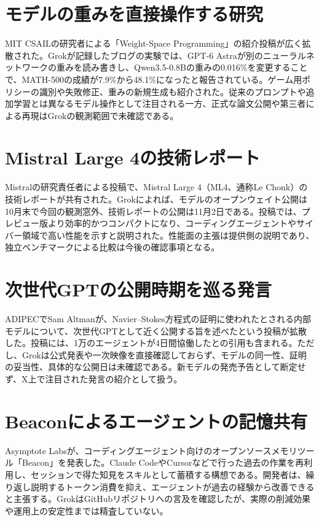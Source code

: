\section{モデルの重みを直接操作する研究}
MIT CSAILの研究者による「Weight-Space Programming」の紹介投稿が広く拡散された。Grokが記録したブログの実験では、GPT-6 Astraが別のニューラルネットワークの重みを読み書きし、Qwen3.5-0.8Bの重みの0.016\%を変更することで、MATH-500の成績が7.9\%から48.1\%になったと報告されている。ゲーム用ポリシーの識別や失敗修正、重みの新規生成も紹介された。従来のプロンプトや追加学習とは異なるモデル操作として注目される一方、正式な論文公開や第三者による再現はGrokの観測範囲で未確認である。

\section{Mistral Large 4の技術レポート}
Mistralの研究責任者による投稿で、Mistral Large 4（ML4、通称Le Chonk）の技術レポートが共有された。Grokによれば、モデルのオープンウェイト公開は10月末で今回の観測窓外、技術レポートの公開は11月2日である。投稿では、プレビュー版より効率的かつコンパクトになり、コーディングエージェントやサイバー領域で高い性能を示すと説明された。性能面の主張は提供側の説明であり、独立ベンチマークによる比較は今後の確認事項となる。

\section{次世代GPTの公開時期を巡る発言}
ADIPECでSam Altmanが、Navier--Stokes方程式の証明に使われたとされる内部モデルについて、次世代GPTとして近く公開する旨を述べたという投稿が拡散した。投稿には、1万のエージェントが4日間協働したとの引用も含まれる。ただし、Grokは公式発表や一次映像を直接確認しておらず、モデルの同一性、証明の妥当性、具体的な公開日は未確認である。新モデルの発売予告として断定せず、X上で注目された発言の紹介として扱う。

\section{Beaconによるエージェントの記憶共有}
Asymptote Labsが、コーディングエージェント向けのオープンソースメモリツール「Beacon」を発表した。Claude CodeやCursorなどで行った過去の作業を再利用し、セッションで得た知見をスキルとして蓄積する構想である。開発者は、繰り返し説明するトークン消費を抑え、エージェントが過去の経験から改善できると主張する。GrokはGitHubリポジトリへの言及を確認したが、実際の削減効果や運用上の安定性までは精査していない。


